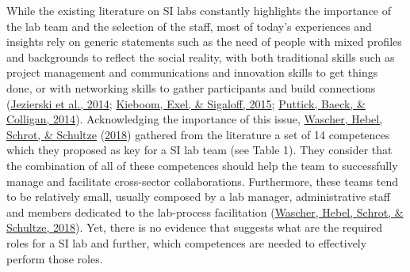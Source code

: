 \documentclass[]{elsarticle} %
\begin{document}
While the existing literature on SI labs constantly highlights the
importance of the lab team and the selection of the staff, most of
today's experiences and insights rely on generic statements such as the
need of people with mixed profiles and backgrounds to reflect the social
reality, with both traditional skills such as project management and
communications and innovation skills to get things done, or with
networking skills to gather participants and build connections
(\protect\hyperlink{ref-Jezierski2014}{Jezierski et al., 2014};
\protect\hyperlink{ref-Kieboom2015}{Kieboom, Exel, \& Sigaloff, 2015};
\protect\hyperlink{ref-Puttick2014-Teams}{Puttick, Baeck, \& Colligan,
2014}). Acknowledging the importance of this issue,
\protect\hyperlink{ref-Wascher2018}{Wascher, Hebel, Schrot, \& Schultze}
(\protect\hyperlink{ref-Wascher2018}{2018}) gathered from the literature
a set of 14 competences which they proposed as key for a SI lab team
(see Table 1). They consider that the combination of all of these
competences should help the team to successfully manage and facilitate
cross-sector collaborations. Furthermore, these teams tend to be
relatively small, usually composed by a lab manager, administrative
staff and members dedicated to the lab-process facilitation
(\protect\hyperlink{ref-Wascher2018}{Wascher, Hebel, Schrot, \&
Schultze, 2018}). Yet, there is no evidence that suggests what are the
required roles for a SI lab and further, which competences are needed to
effectively perform those roles.

\providecommand{\docline}[3]{\noalign{\global\setlength{\arrayrulewidth}{#1}}\arrayrulecolor[HTML]{#2}\cline{#3}}

\setlength{\tabcolsep}{2pt}

\renewcommand*{\arraystretch}{1.5}
\end{document}
